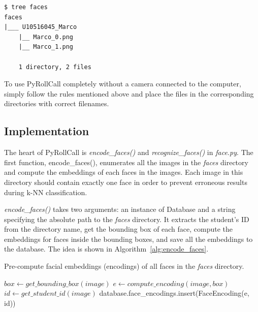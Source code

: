 \begin{lstlisting}[numbers=none,xleftmargin=0em,caption={Example hierarchy of the \emph{faces} directory.},label={lst:faces-tree-output}]
$ tree faces 
faces
|___ U10516045_Marco
    |__ Marco_0.png
    |__ Marco_1.png

    1 directory, 2 files
\end{lstlisting}
\vspace{0.2cm}

To use PyRollCall completely without a camera connected to the computer,
simply follow the rules mentioned above and place the files in the corresponding directories
with correct filenames.

\subsection{Implementation}
The heart of PyRollCall is \emph{encode\_faces()} and \emph{recognize\_faces()} in \emph{face.py}.
The first function, encode\_faces(), enumerates all the images in the \emph{faces} directory
and compute the embeddings of each faces in the images. Each image in this directory
should contain exactly one face in order to prevent erroneous results during k-NN classification.

\emph{encode\_faces()} takes two arguments: an instance of Database and a string specifying
the absolute path to the \emph{faces} directory. It extracts the student's ID from the directory name,
get the bounding box of each face, compute the embeddings for faces inside the bounding boxes,
and save all the embeddings to the database. The idea is shown in Algorithm~\ref{alg:encode_faces}.
\vspace{0.2cm}

\begin{algorithm}
  \caption{Pre-compute facial embeddings (encodings) of all faces in the \emph{faces} directory.}
  \label{alg:encode_faces}
  \begin{algorithmic}
        \State $box \leftarrow get\_bounding\_box(image)$
        \State $e \leftarrow compute\_encoding(image, box)$
        \State $id \leftarrow get\_student\_id(image)$
        \State database.face\_encodings.insert(FaceEncoding(e, id)) 
      \EndFor
    \EndProcedure
  \end{algorithmic}
\end{algorithm}
\vspace{0.5cm}


